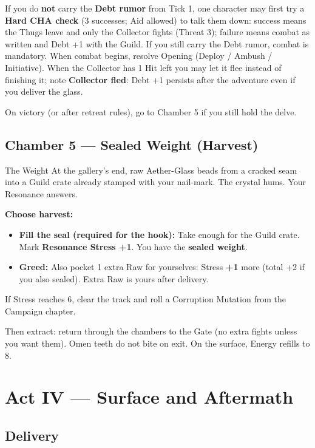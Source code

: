 If you do \textbf{not} carry the \textbf{Debt rumor} from Tick 1, one character may first try a \textbf{Hard CHA check} (3 successes; Aid allowed) to talk them down: success means the Thugs leave and only the Collector fights (Threat 3); failure means combat as written and Debt +1 with the Guild.
If you still carry the Debt rumor, combat is mandatory.
When combat begins, resolve Opening (Deploy / Ambush / Initiative).
When the Collector has 1 Hit left you may let it flee instead of finishing it; note \textbf{Collector fled}: Debt +1 persists after the adventure even if you deliver the glass.

On victory (or after retreat rules), go to Chamber 5 if you still hold the delve.

\subsection{Chamber 5 --- Sealed Weight (Harvest)}

\begin{rpgbox}{The Weight}
    At the gallery's end, raw Aether-Glass beads from a cracked seam into a Guild crate already stamped with your nail-mark.
    The crystal hums. Your Resonance answers.
\end{rpgbox}

\textbf{Choose harvest:}
\begin{itemize}
    \item \textbf{Fill the seal (required for the hook):} Take enough for the Guild crate. Mark \textbf{Resonance Stress +1}. You have the \textbf{sealed weight}.
    \item \textbf{Greed:} Also pocket 1 extra Raw for yourselves: Stress \textbf{+1} more (total +2 if you also sealed). Extra Raw is yours after delivery.
\end{itemize}

If Stress reaches 6, clear the track and roll a Corruption Mutation from the Campaign chapter.

Then extract: return through the chambers to the Gate (no extra fights unless you want them). Omen teeth do not bite on exit. On the surface, Energy refills to 8.

\section{Act IV --- Surface and Aftermath}

\subsection{Delivery}

